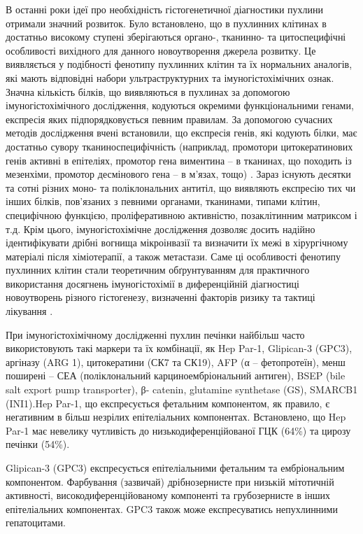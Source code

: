 В останні роки  ідеї про необхідність гістогенетичної діагностики пухлини отримали значний розвиток. Було встановлено, що в пухлинних клітинах в достатньо високому ступені зберігаються органо-,  тканинно- та цитоспецифічні особливості вихідного для данного новоутворення джерела розвитку. Це виявляється у подібності фенотипу пухлинних клітин та їх нормальних аналогів, які мають відповідні набори ультраструктурних та імуногістохімічних ознак. Значна кількість білків, що виявляються в пухлинах за допомогою імуногістохімічного дослідження, кодуються окремими функціональними генами, експресія яких підпорядковується певним правилам. За допомогою сучасних методів дослідження вчені встановили, що експресія генів, які кодують білки, має достатньо  сувору тканиноспецифічність (наприклад, промотори цитокератинових генів активні в епітеліях, промотор гена виментина – в тканинах, що походить із мезенхіми, промотор десмінового гена – в м’язах, тощо) \cite{pmid22648963}. 
Зараз існують десятки та сотні різних моно- та поліклональних антитіл, що виявляють експресію тих чи інших білків, пов’язаних з певними органами, тканинами, типами клітин, специфічною функцією, проліферативною активністю, позаклітинним матриксом і т.д. Крім цього, імуногістохімічне дослідження  дозволяє досить надійно ідентифікувати дрібні вогнища мікроінвазії та визначити їх межі в хірургічному матеріалі після хіміотерапії, а також  метастази. Саме ці особливості фенотипу пухлинних клітин стали теоретичним обґрунтуванням для практичного використання досягнень імуногістохімії в диференційній діагностиці новоутворень різного гістогенезу, визначенні факторів ризику та тактиці лікування \cite{pmid27781375}. 

При  імуногістохімічному  дослідженні пухлин печінки  найбільш часто використовують  такі маркери та їх комбінації,  як  Hep Par-1, Glipican-3 (GPC3), аргіназу  (ARG 1), цитокератини (СК7 та СК19),  AFP (α – фетопротеїн), менш поширені – СЕА (поліклональний карциноембріональний антиген), BSEP (bile salt export pump transporter),  β- catenin, glutamine synthetase (GS), SMARCB1 (INI1).Hep Par-1, що експресується  фетальним компонентом, як правило, є  негативним в більш незрілих епітеліальних компонентах. Встановлено, що Hep Par-1 має невелику чутливість до низькодиференційованої  ГЦК (64\%) та цирозу печінки  (54\%). 

Glipican-3 (GPC3) експресується епітеліальними фетальним та ембріональним компонентом. Фарбування (зазвичай)  дрібнозернисте  при низькій мітотичній активності, високодиференційованому компоненті та грубозернисте в інших епітеліальних компонентах.      GPC3  також може експресуватись непухлинними гепатоцитами. 

